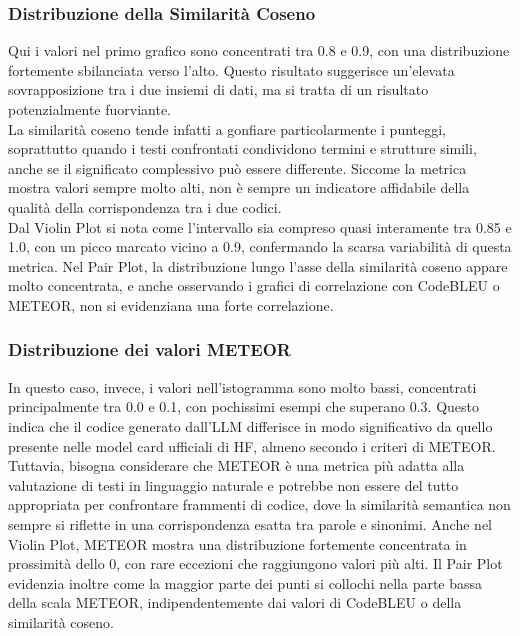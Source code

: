 \documentclass{article}
\begin{document}
\subsubsection{Distribuzione della Similarità Coseno}
Qui i valori nel primo grafico sono concentrati tra 0.8 e 0.9, con una distribuzione fortemente sbilanciata verso l’alto. Questo risultato suggerisce un’elevata sovrapposizione tra i due insiemi di dati, ma si tratta di un risultato potenzialmente fuorviante.\\
La similarità coseno tende infatti a gonfiare particolarmente i punteggi, soprattutto quando i testi confrontati condividono termini e strutture simili, anche se il significato complessivo può essere differente. Siccome la metrica mostra valori sempre molto alti, non è sempre un indicatore affidabile della qualità della corrispondenza tra i due codici.\\
Dal Violin Plot si nota come l’intervallo sia compreso quasi interamente tra 0.85 e 1.0, con un picco marcato vicino a 0.9, confermando la scarsa variabilità di questa metrica. Nel Pair Plot, la distribuzione lungo l’asse della similarità coseno appare molto concentrata, e anche osservando i grafici di correlazione con CodeBLEU o METEOR, non si evidenziana una forte correlazione.

\subsubsection{Distribuzione dei valori METEOR}
In questo caso, invece, i valori nell'istogramma sono molto bassi, concentrati principalmente tra 0.0 e 0.1, con pochissimi esempi che superano 0.3. Questo indica che il codice generato dall’LLM differisce in modo significativo da quello presente nelle model card ufficiali di HF, almeno secondo i criteri di METEOR.\\
Tuttavia, bisogna considerare che METEOR è una metrica più adatta alla valutazione di testi in linguaggio naturale e potrebbe non essere del tutto appropriata per confrontare frammenti di codice, dove la similarità semantica non sempre si riflette in una corrispondenza esatta tra parole e sinonimi. Anche nel Violin Plot, METEOR mostra una distribuzione fortemente concentrata in prossimità dello 0, con rare eccezioni che raggiungono valori più alti. Il Pair Plot evidenzia inoltre come la maggior parte dei punti si collochi nella parte bassa della scala METEOR, indipendentemente dai valori di CodeBLEU o della similarità coseno.
\end{document}
